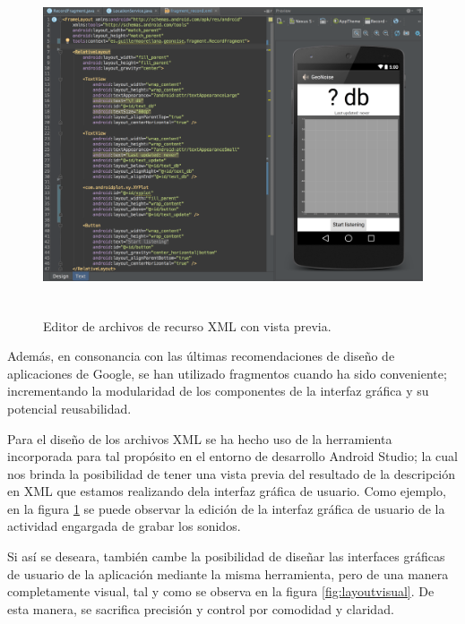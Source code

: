  \begin{figure}[h] \centering
    \includegraphics[height=10cm]{graphs/layoutedit.png} \caption{Editor de archivos de recurso XML con vista previa.}\label{fig:layoutedit}
\end{figure}

    Además, en consonancia con las últimas recomendaciones de diseño de aplicaciones de Google, se han utilizado fragmentos cuando ha sido conveniente; incrementando la modularidad de los componentes de la interfaz gráfica y su potencial reusabilidad.

    Para el diseño de los archivos XML se ha hecho uso de la herramienta incorporada para tal     propósito en el entorno de desarrollo Android Studio; la cual nos brinda la posibilidad de tener una vista previa del resultado de la descripción en XML que estamos realizando dela interfaz gráfica de usuario. Como ejemplo, en la figura \ref{fig:layoutedit} se puede observar la edición de la interfaz gráfica de usuario de la actividad engargada de grabar los sonidos.

Si así se deseara, también cambe la posibilidad de diseñar las interfaces gráficas de usuario de la aplicación mediante la misma herramienta, pero de una manera completamente visual, tal y como se observa en la figura \ref{fig:layoutvisual}. De esta manera, se sacrifica precisión y control por comodidad y claridad.

